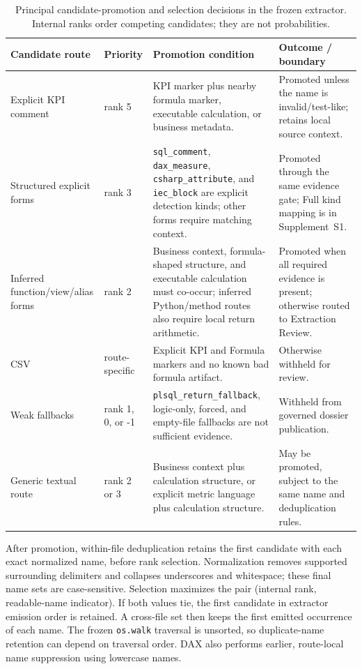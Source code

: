 \documentclass[a4paper,fleqn]{cas-dc}
\begin{document}
\begin{table}[!t]
\centering
\caption{Principal candidate-promotion and selection decisions in the frozen extractor. Internal ranks order competing candidates; they are not probabilities.}
\label{tab:candidate-decisions}
\begin{tabularx}{\textwidth}{p{}p{}XX}
\toprule
\textbf{Candidate route} & \textbf{Priority} & \textbf{Promotion condition} & \textbf{Outcome / boundary} \\
\midrule
Explicit KPI comment & rank 5 & KPI marker plus nearby formula marker, executable calculation, or business metadata. & Promoted unless the name is invalid/test-like; retains local source context. \\
Structured explicit forms & rank 3 & \texttt{sql\_comment}, \texttt{dax\_measure}, \texttt{csharp\_attribute}, and \texttt{iec\_block} are explicit detection kinds; other forms require matching context. & Promoted through the same evidence gate; Full kind mapping is in Supplement~S1. \\
Inferred function/view/alias forms & rank 2 & Business context, formula-shaped structure, and executable calculation must co-occur; inferred Python/method routes also require local return arithmetic. & Promoted when all required evidence is present; otherwise routed to Extraction Review. \\
CSV & route-specific & Explicit KPI and Formula markers and no known bad formula artifact. & Otherwise withheld for review. \\
Weak fallbacks & rank 1, 0, or -1 & \texttt{plsql\_return\_fallback}, logic-only, forced, and empty-file fallbacks are not sufficient evidence. & Withheld from governed dossier publication. \\
Generic textual route & rank 2 or 3 & Business context plus calculation structure, or explicit metric language plus calculation structure. & May be promoted, subject to the same name and deduplication rules. \\
\bottomrule
\end{tabularx}
\end{table}

After promotion, within-file deduplication retains the first candidate with each exact normalized name, before rank selection. Normalization removes supported surrounding delimiters and collapses underscores and whitespace; these final name sets are case-sensitive. Selection maximizes the pair (internal rank, readable-name indicator). If both values tie, the first candidate in extractor emission order is retained. A cross-file set then keeps the first emitted occurrence of each name. The frozen \texttt{os.walk} traversal is unsorted, so duplicate-name retention can depend on traversal order. DAX also performs earlier, route-local name suppression using lowercase names.
\end{document}
